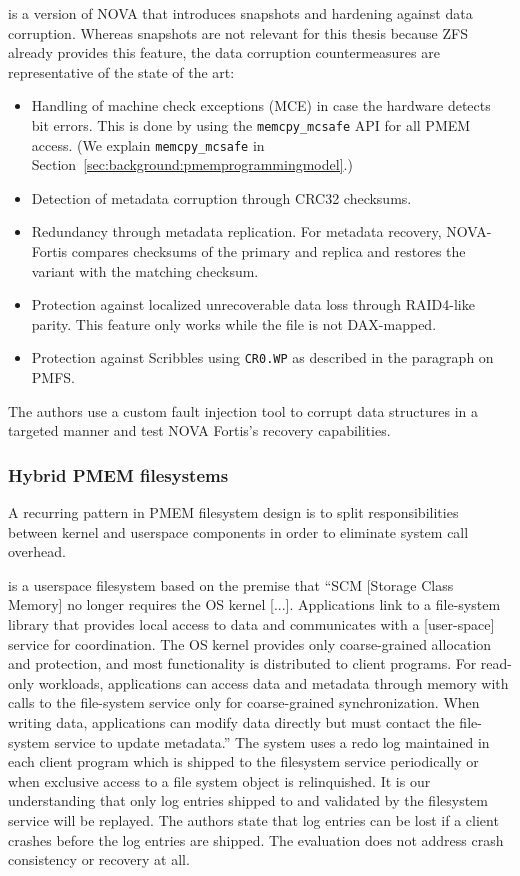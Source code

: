 \documentclass[12pt,a4paper,twoside]{book}
\begin{document}
 is a version of NOVA that introduces snapshots and hardening against data corruption.
Whereas snapshots are not relevant for this thesis because ZFS already provides this feature, the data corruption countermeasures are representative of the state of the art:
\begin{itemize}[noitemsep,beginpenalty=100000,midpenalty=100000]
    \item Handling of machine check exceptions (MCE) in case the hardware detects bit errors.
          This is done by using the \lstinline{memcpy_mcsafe} API for all PMEM access.
          (We explain \lstinline{memcpy_mcsafe} in Section~\ref{sec:background:pmemprogrammingmodel}.)
    \item Detection of metadata corruption through CRC32 checksums.
    \item Redundancy through metadata replication. For metadata recovery, NOVA-Fortis compares checksums of the primary and replica and restores the variant with the matching checksum.
    \item Protection against localized unrecoverable data loss through RAID4-like parity.
          This feature only works while the file is not DAX-mapped.
    \item Protection against Scribbles using \lstinline{CR0.WP} as described in the paragraph on PMFS.
\end{itemize}
The authors use a custom fault injection tool to corrupt data structures in a targeted manner and test NOVA Fortis's recovery capabilities.

\subsubsection{Hybrid PMEM filesystems}\label{sec:hybrid_pmem_file_systems}
A recurring pattern in PMEM filesystem design is to split responsibilities between kernel and userspace components in order to eliminate system call overhead.

 is a userspace filesystem based on the premise that
“SCM [Storage Class Memory] no longer requires the OS kernel [...].
Applications link to a file-system library that provides local access to data and communicates with a [user-space] service for coordination.
The OS kernel provides only coarse-grained allocation and protection, and most functionality is distributed to client programs.
For read-only workloads, applications can access data and metadata through memory with calls to the file-system service only for coarse-grained synchronization.
When writing data, applications can modify data directly but must contact the file-system service to update metadata.”
The system uses a redo log maintained in each client program which is shipped to the filesystem service periodically or when exclusive access to a file system object is relinquished.
It is our understanding that only log entries shipped to and validated by the filesystem service will be replayed.
The authors state that log entries can be lost if a client crashes before the log entries are shipped.
The evaluation does not address crash consistency or recovery at all.
\end{document}
